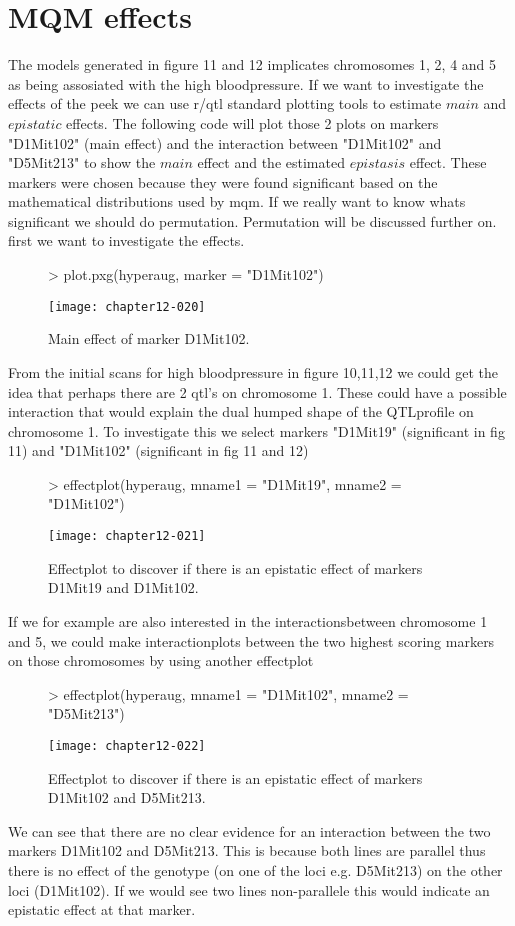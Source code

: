 \documentclass[11pt]{article}
\begin{document}
\section{MQM effects}
The models generated in figure 11 and 12 implicates chromosomes 1, 2, 4 and 5 as being assosiated with the high bloodpressure. If we want to investigate the effects of the peek we can use r/qtl standard plotting tools to estimate $main$ and $epistatic$ effects. The following code will plot those 2 plots on markers "D1Mit102" (main effect) and the interaction between "D1Mit102" and "D5Mit213" to show the $main$ effect and the estimated $epistasis$ effect. These markers were chosen because they were found significant based on the mathematical distributions used by mqm. If we really want to know whats significant we should do permutation. Permutation will be discussed further on. first we want to investigate the effects.
\begin{figure}[ht]
\begin{Schunk}
\begin{Sinput}
> plot.pxg(hyperaug, marker = "D1Mit102")
\end{Sinput}
\end{Schunk}
\texttt{[image: chapter12-020]}
\caption{Main effect of marker D1Mit102.}
\end{figure}
From the initial scans for high bloodpressure in figure 10,11,12 we could get the idea that perhaps there are 2 qtl's on chromosome 1. These could have a possible interaction that would explain the dual humped shape of the QTLprofile on chromosome 1. To investigate this we select markers
"D1Mit19" (significant in fig 11) and "D1Mit102" (significant in fig 11 and 12)
\begin{figure}[ht]
\begin{Schunk}
\begin{Sinput}
> effectplot(hyperaug, mname1 = "D1Mit19", mname2 = "D1Mit102")
\end{Sinput}
\end{Schunk}
\texttt{[image: chapter12-021]}
\caption{Effectplot to discover if there is an epistatic effect of markers D1Mit19 and D1Mit102.}
\end{figure}
If we for example are also interested in the interactionsbetween chromosome 1 and 5, we could make interactionplots between the two highest scoring markers on those chromosomes by using another effectplot
\begin{figure}[ht]
\begin{Schunk}
\begin{Sinput}
> effectplot(hyperaug, mname1 = "D1Mit102", mname2 = "D5Mit213")
\end{Sinput}
\end{Schunk}
\texttt{[image: chapter12-022]}
\caption{Effectplot to discover if there is an epistatic effect of markers D1Mit102 and D5Mit213.}
\end{figure}
We can see that there are no clear evidence for an interaction between the two markers D1Mit102 and D5Mit213. This is because both lines are parallel thus there is no effect of the genotype (on one of the loci e.g. D5Mit213) on the other loci (D1Mit102). If we would see two lines non-parallele this would indicate an epistatic effect at that marker. 
\clearpage
\end{document}
